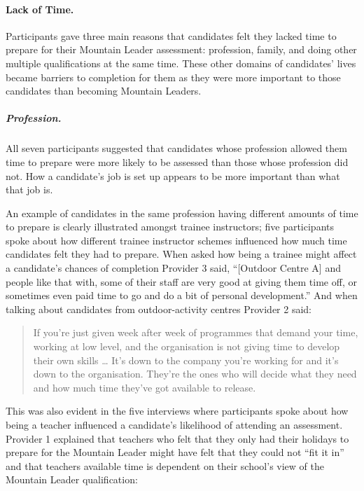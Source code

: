 \documentclass[
  12pt,
  a4paper,
]{book}
\begin{document}
\hypertarget{qual-gta-lack-of-time}{%
\paragraph{Lack of Time.}\label{qual-gta-lack-of-time}}

Participants gave three main reasons that candidates felt they lacked time to prepare for their Mountain Leader assessment: profession, family, and doing other multiple qualifications at the same time. These other domains of candidates' lives became barriers to completion for them as they were more important to those candidates than becoming Mountain Leaders.

\hypertarget{profession.}{%
\subparagraph{Profession.}\label{profession.}}

All seven participants suggested that candidates whose profession allowed them time to prepare were more likely to be assessed than those whose profession did not. How a candidate's job is set up appears to be more important than what that job is.

An example of candidates in the same profession having different amounts of time to prepare is clearly illustrated amongst trainee instructors; five participants spoke about how different trainee instructor schemes influenced how much time candidates felt they had to prepare. When asked how being a trainee might affect a candidate's chances of completion Provider 3 said, ``{[}Outdoor Centre A{]} and people like that with, some of their staff are very good at giving them time off, or sometimes even paid time to go and do a bit of personal development.'' And when talking about candidates from outdoor-activity centres Provider 2 said:

\begin{quote}
If you're just given week after week of programmes that demand your time, working at low level, and the organisation is not giving time to develop their own skills \ldots{} It's down to the company you're working for and it's down to the organisation. They're the ones who will decide what they need and how much time they've got available to release.
\end{quote}

This was also evident in the five interviews where participants spoke about how being a teacher influenced a candidate's likelihood of attending an assessment. Provider 1 explained that teachers who felt that they only had their holidays to prepare for the Mountain Leader might have felt that they could not ``fit it in'' and that teachers available time is dependent on their school's view of the Mountain Leader qualification:
\end{document}
